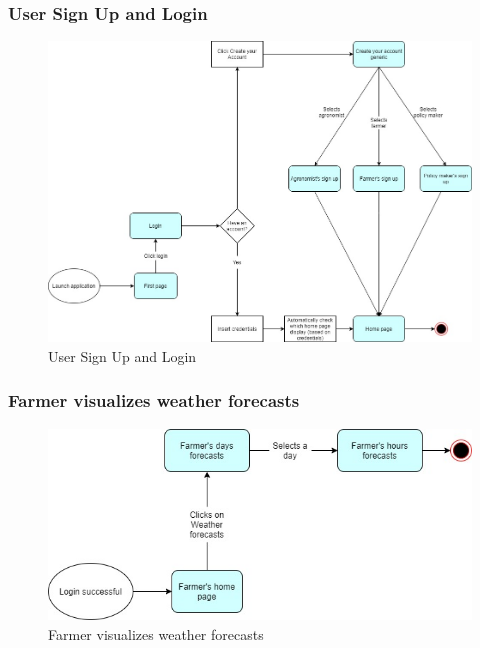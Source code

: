 \documentclass{article}
\begin{document}
        \subsubsection{User Sign Up and Login}
            \begin{figure} [h]
                \centering
                \includegraphics[width=1\textwidth]{images/UserInterfaces/MapsFunctionalities/1. UserSignUpAndLogin.jpg}
                \caption{\label{fig:UserSignUpLogin}User Sign Up and Login}
            \end{figure}
    
        \newpage
        
        
        \subsubsection{Farmer visualizes weather forecasts}
            \begin{figure} [h]
                \centering
                \includegraphics[width=1\textwidth]{images/UserInterfaces/MapsFunctionalities/2. FarmerVisualizeWeatherForecasts.jpg}
                \caption{\label{fig:FarmerWeatherForecasts}Farmer visualizes weather forecasts}
            \end{figure}
            
\end{document}
